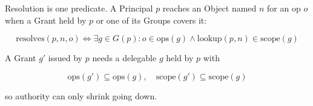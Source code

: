 Resolution is one predicate. A Principal $p$ reaches an Object named $n$ for an op $o$ when a Grant
held by $p$ or one of its Groups covers it:

$$\mathrm{resolves}(p, n, o) \iff \exists g \in G(p) : o \in \mathrm{ops}(g) \wedge \mathrm{lookup}(p, n) \in \mathrm{scope}(g)$$

A Grant $g'$ issued by $p$ needs a delegable $g$ held by $p$ with

$$\mathrm{ops}(g') \subseteq \mathrm{ops}(g), \quad \mathrm{scope}(g') \subseteq \mathrm{scope}(g)$$

so authority can only shrink going down.
